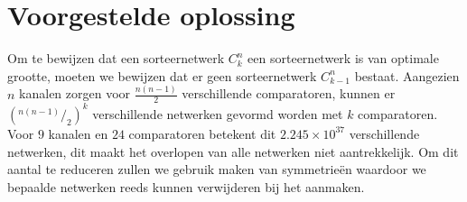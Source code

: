 \documentclass{article}
\begin{document}
\newcommand*\rfrac[2]{{}^{#1}\!/_{#2}}
\section{Voorgestelde oplossing}\label{VoorgesteldeOplossing}
Om te bewijzen dat een sorteernetwerk $C^n_k$ een sorteernetwerk is van optimale grootte, moeten we bewijzen dat er geen sorteernetwerk $C^n_{k-1}$ bestaat.
Aangezien $n$ kanalen zorgen voor $\frac{n \left(n-1\right)}{2}$ verschillende comparatoren, kunnen er $\left(\rfrac{n \left(n-1\right)}{2}\right) ^k$ verschillende netwerken gevormd worden met  $k$ comparatoren.
Voor $9$ kanalen en $24$ comparatoren betekent dit $2.245 \times 10^{37}$ verschillende netwerken, dit maakt het overlopen van alle netwerken niet aantrekkelijk.
Om dit aantal te reduceren zullen we gebruik maken van symmetrie\"en waardoor we bepaalde netwerken reeds kunnen verwijderen bij het aanmaken.
\end{document}
